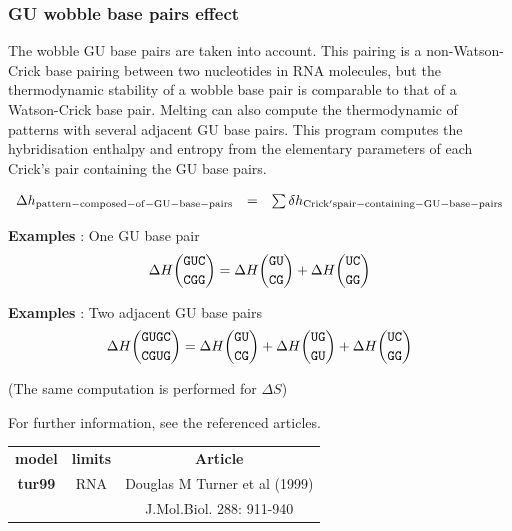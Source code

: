\documentclass{article}
\begin{document}
\pagebreak
\subsubsection{GU wobble base pairs effect}

The wobble GU base pairs are taken into account. This pairing is a non-Watson-Crick base pairing between two nucleotides 
in RNA molecules, but the thermodynamic stability of a wobble base pair is comparable to that of a Watson-Crick base pair.
Melting can also compute the thermodynamic of patterns with several adjacent GU base pairs.
This program computes the hybridisation enthalpy and entropy from the elementary 
parameters of each Crick's pair containing the GU base pairs.

\begin{displaymath}
  \begin{array}[t]{ccc}
  \Delta{}h_\mathrm{pattern-composed-of-GU-base-pairs}&=&\sum \delta{}h_\mathrm{Crick's pair-containing-GU-base-pairs}\\
  \end{array}
\end{displaymath}

\textbf{Examples} : One GU base pair
\begin{multline*}
\Delta H {\mbox{\texttt{GUC}} \choose \mbox{\texttt{CGG}}} = 
\Delta H {\mbox{\texttt{GU}} \choose \mbox{\texttt{CG}}} +
\Delta H {\mbox{\texttt{UC}} \choose \mbox{\texttt{GG}}}\\
\end{multline*}

\textbf{Examples} : Two adjacent GU base pairs
\begin{multline*}
\Delta H {\mbox{\texttt{GUGC}} \choose \mbox{\texttt{CGUG}}} = 
\Delta H {\mbox{\texttt{GU}} \choose \mbox{\texttt{CG}}} +
\Delta H {\mbox{\texttt{UG}} \choose \mbox{\texttt{GU}}} +
\Delta H {\mbox{\texttt{UC}} \choose \mbox{\texttt{GG}}}\\
\end{multline*}

       (The same computation is performed for $\Delta S$) 

       
For further information, see the referenced articles.

\begin{table}[hc]
\begin{tabular}[h]{| c | c | c |}
\hline
\textbf{model} & \textbf{limits} & \textbf{Article} \\
\textbf{tur99} & RNA & Douglas M Turner et al (1999) \\
 & & J.Mol.Biol.  288: 911-940 \\
\hline
\end{tabular}
\end{table}
\end{document}
